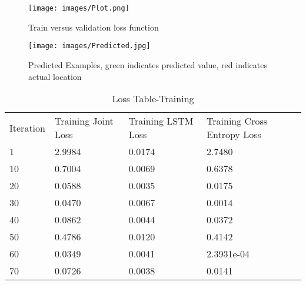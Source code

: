 \documentclass[sigconf]{acmart}
\begin{document}
 
\begin{figure}[htbp]
  \texttt{[image: images/Plot.png]}
  \caption{Train versus validation loss function}
  \label{fig:Evaluation plot}
\end{figure}


\begin{figure}[htbp]
  \texttt{[image: images/Predicted.jpg]}
  \caption{Predicted Examples, green indicates predicted value, red indicates actual location}
  \label{fig:Prediction Examples}
\end{figure}


\begin{table}[]
\centering
\caption{Loss Table-Training}
\label{table1}
\begin{tabular}{llll}
Iteration & Training Joint Loss & Training LSTM Loss & Training Cross Entropy Loss \\
1         & 2.9984              & 0.0174             & 2.7480                      \\
10        & 0.7004              & 0.0069             & 0.6378                      \\
20        & 0.0588              & 0.0035             & 0.0175                      \\
30        & 0.0470              & 0.0067             & 0.0014                      \\
40        & 0.0862              & 0.0044             & 0.0372                      \\
50        & 0.4786              & 0.0120             & 0.4142                      \\
60        & 0.0349              & 0.0041             & 2.3931e-04                  \\
70        & 0.0726              & 0.0038             & 0.0141                     
\end{tabular}
\end{table}
\end{document}
